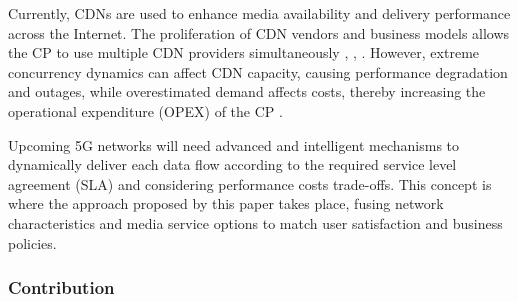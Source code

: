 Currently, CDNs are used to enhance media availability and delivery performance across the Internet. The proliferation of CDN vendors and business models allows the CP to use multiple CDN providers simultaneously \cite{adhikari2012}, \cite{adhikari2012-2}, \cite{adhikari2015}. However, extreme concurrency dynamics can affect CDN capacity, causing performance degradation and outages, while overestimated demand affects costs, thereby increasing the operational expenditure (OPEX) of the CP \cite{silva2020}.

Upcoming 5G networks will need advanced and intelligent mechanisms to dynamically deliver each data flow according to the required service level agreement (SLA) and considering performance costs trade-offs.
This concept is where the approach proposed by this paper takes place, fusing network characteristics and media service options to match user satisfaction and business policies.

\subsubsection{Contribution}
\label{sec:overview}

